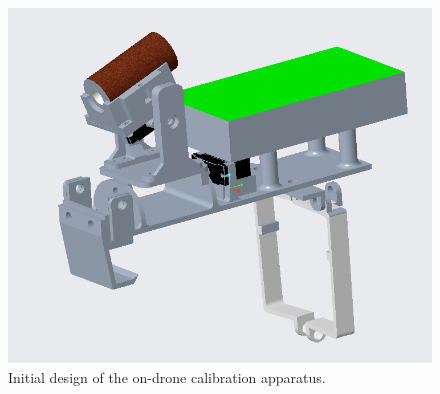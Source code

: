 \begin{figure}[H]
 \centering
 \includegraphics[scale=0.35, angle = 0]{./pictures/teoreticalDesign.png}
 \caption{Initial design of the on-drone calibration apparatus.}
 \label{Drone}
 
\end{figure}







